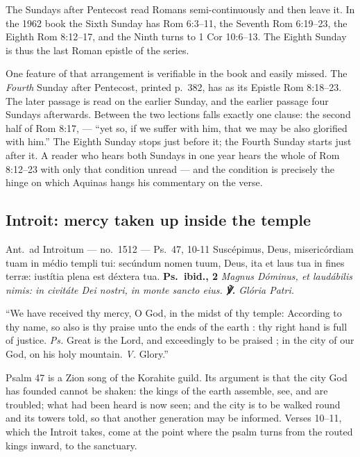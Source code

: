 The Sundays after Pentecost read Romans semi-continuously and then leave it.
In the 1962 book the Sixth Sunday has Rom 6:3--11, the Seventh Rom 6:19--23,
the Eighth Rom 8:12--17, and the Ninth turns to 1 Cor 10:6--13. The Eighth
Sunday is thus the last Roman epistle of the series.

One feature of that arrangement is verifiable in the book and easily missed. The \emph{Fourth} Sunday after Pentecost, printed
p.\ 382, has as its Epistle Rom 8:18--23. The later passage is read on the
earlier Sunday, and the earlier passage four Sundays afterwards. Between the
two lections falls exactly one clause: the second half of Rom 8:17,
 --- ``yet so, if we suffer
with him, that we may be also glorified with him.'' The Eighth Sunday stops
just before it; the Fourth Sunday starts just after it. A reader who hears
both Sundays in one year hears the
whole of Rom 8:12--23 with only that condition unread --- and the condition is
precisely the hinge on which Aquinas hangs his commentary on the verse.

\subsection{Introit: mercy taken up inside the temple }

\begin{appointed}{Ant.\ ad Introitum --- no.\ 1512 --- Ps.\ 47, 10-11}
Suscépimus, Deus, misericórdiam tuam in médio templi tui: secúndum nomen tuum,
Deus, ita et laus tua in fines terr\ae: iustítia plena est déxtera tua.
\upshape\textbf{Ps.\ ibid., 2} \itshape Magnus Dóminus, et laudábilis nimis: in
civitáte Dei nostri, in monte sancto eius. \upshape\textbf{℣.} \itshape Glória
Patri.
\end{appointed}

\begin{englishwitness}
``We have received thy mercy, O God, in the midst of thy temple: According to
thy name, so also is thy praise unto the ends of the earth : thy right hand is
full of justice. \emph{Ps.} Great is the Lord, and exceedingly to be praised ;
in the city of our God, on his holy mountain. \emph{V.} Glory.''
\end{englishwitness}

Psalm 47 is a Zion song of the Korahite guild. Its argument is that the city God
has founded cannot be shaken: the kings of the earth assemble, see, and are
troubled; what had been heard is now seen; and the city is to be walked round and
its towers told, so that another generation may be informed. Verses 10--11, which the Introit takes, come at
the point where the psalm turns from the routed kings inward, to the sanctuary.

